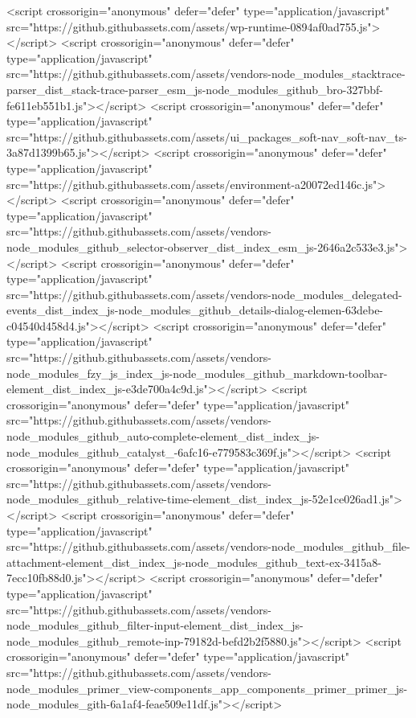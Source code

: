   <script crossorigin="anonymous" defer="defer" type="application/javascript" src="https://github.githubassets.com/assets/wp-runtime-0894af0ad755.js"></script>
<script crossorigin="anonymous" defer="defer" type="application/javascript" src="https://github.githubassets.com/assets/vendors-node_modules_stacktrace-parser_dist_stack-trace-parser_esm_js-node_modules_github_bro-327bbf-fe611eb551b1.js"></script>
<script crossorigin="anonymous" defer="defer" type="application/javascript" src="https://github.githubassets.com/assets/ui_packages_soft-nav_soft-nav_ts-3a87d1399b65.js"></script>
<script crossorigin="anonymous" defer="defer" type="application/javascript" src="https://github.githubassets.com/assets/environment-a20072ed146c.js"></script>
<script crossorigin="anonymous" defer="defer" type="application/javascript" src="https://github.githubassets.com/assets/vendors-node_modules_github_selector-observer_dist_index_esm_js-2646a2c533e3.js"></script>
<script crossorigin="anonymous" defer="defer" type="application/javascript" src="https://github.githubassets.com/assets/vendors-node_modules_delegated-events_dist_index_js-node_modules_github_details-dialog-elemen-63debe-c04540d458d4.js"></script>
<script crossorigin="anonymous" defer="defer" type="application/javascript" src="https://github.githubassets.com/assets/vendors-node_modules_fzy_js_index_js-node_modules_github_markdown-toolbar-element_dist_index_js-e3de700a4c9d.js"></script>
<script crossorigin="anonymous" defer="defer" type="application/javascript" src="https://github.githubassets.com/assets/vendors-node_modules_github_auto-complete-element_dist_index_js-node_modules_github_catalyst_-6afc16-e779583c369f.js"></script>
<script crossorigin="anonymous" defer="defer" type="application/javascript" src="https://github.githubassets.com/assets/vendors-node_modules_github_relative-time-element_dist_index_js-52e1ce026ad1.js"></script>
<script crossorigin="anonymous" defer="defer" type="application/javascript" src="https://github.githubassets.com/assets/vendors-node_modules_github_file-attachment-element_dist_index_js-node_modules_github_text-ex-3415a8-7ecc10fb88d0.js"></script>
<script crossorigin="anonymous" defer="defer" type="application/javascript" src="https://github.githubassets.com/assets/vendors-node_modules_github_filter-input-element_dist_index_js-node_modules_github_remote-inp-79182d-befd2b2f5880.js"></script>
<script crossorigin="anonymous" defer="defer" type="application/javascript" src="https://github.githubassets.com/assets/vendors-node_modules_primer_view-components_app_components_primer_primer_js-node_modules_gith-6a1af4-feae509e11df.js"></script>
